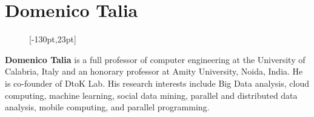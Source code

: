 



%




\section*{Domenico Talia}\label{DomenicoTalia}
\begin{figure}
\vspace*{-16.5pt}
[-130pt,23pt]
\vspace*{-18.5pt}
\end{figure} \textbf{Domenico Talia} is a full professor of computer engineering at the University of Calabria, Italy and an honorary professor at Amity University, Noida, India. He is co-founder of DtoK Lab. His research interests include Big Data analysis, cloud computing, machine learning, social data mining, parallel and distributed data analysis, mobile computing, and parallel programming.

